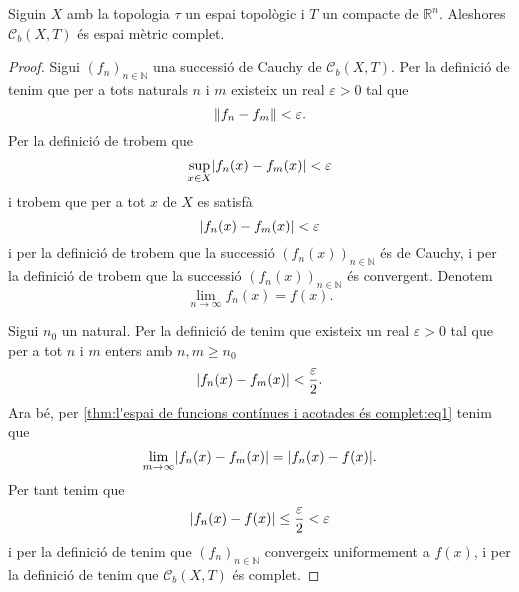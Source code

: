 \documentclass[../Apunts.tex]{subfiles}
\begin{document}
	\begin{theorem}
		\label{thm:l'espai de funcions contínues i acotades és complet}
		Siguin \(X\) amb la topologia \(\tau\) un espai topològic i \(T\) un compacte de \(\mathbb{R}^{n}\). Aleshores \(\mathcal{C}_{b}(X,T)\) és espai mètric complet.
		\begin{proof}
			Sigui \((f_{n})_{n\in\mathbb{N}}\) una successió de Cauchy de \(\mathcal{C}_{b}(X,T)\). Per la definició de  tenim que per a tots naturals \(n\) i \(m\) existeix un real \(\varepsilon>0\) tal que
			\[\norm{f_{n}-f_{m}}<\varepsilon.\]
			Per la definició de  trobem que
			\[\sup_{x\in X}\abs{f_{n}(x)-f_{m}(x)}<\varepsilon\]
			i trobem que per a tot \(x\) de \(X\) es satisfà
			\[\abs{f_{n}(x)-f_{m}(x)}<\varepsilon\]
			i per la definició de  trobem que la successió \((f_{n}(x))_{n\in\mathbb{N}}\) és de Cauchy, i per la definició de  trobem que la successió \((f_{n}(x))_{n\in\mathbb{N}}\) és convergent. Denotem
			\begin{equation}
				\label{thm:l'espai de funcions contínues i acotades és complet:eq1}
				\lim_{n\to\infty}f_{n}(x)=f(x).
			\end{equation}
			
			Sigui \(n_{0}\) un natural. Per la definició de  tenim que existeix un real \(\varepsilon>0\) tal que per a tot \(n\) i \(m\) enters amb \(n,m\geq n_{0}\)
			\[\abs{f_{n}(x)-f_{m}(x)}<\frac{\varepsilon}{2}.\]
			Ara bé, per \eqref{thm:l'espai de funcions contínues i acotades és complet:eq1} tenim que
			\[\lim_{m\to\infty}\abs{f_{n}(x)-f_{m}(x)}=\abs{f_{n}(x)-f(x)}.\]
			Per tant tenim que
			\[\abs{f_{n}(x)-f(x)}\leq\frac{\varepsilon}{2}<\varepsilon\]
			i per la definició de  tenim que \((f_{n})_{n\in\mathbb{N}}\) convergeix uniformement a \(f(x)\), i per la definició de  tenim que \(\mathcal{C}_{b}(X,T)\) és complet.
		\end{proof}
	\end{theorem}
\end{document}
